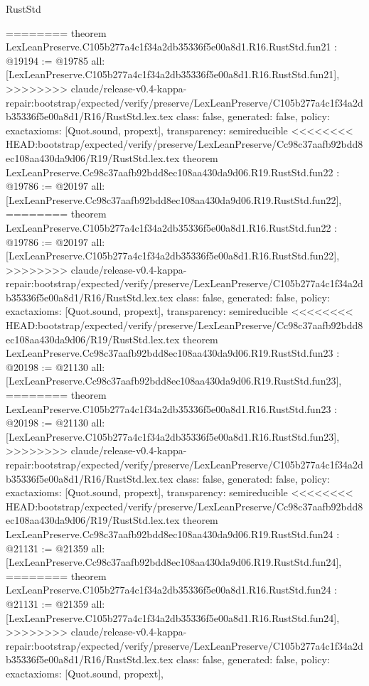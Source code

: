 \begin{lexlean}{RustStd}
\begin{coremodule}
{\begin{coremodule}
{{{{{{{{{{{{{{{{{{{{{{{{========
theorem LexLeanPreserve.C105b277a4c1f34a2db35336f5e00a8d1.R16.RustStd.fun21 : @19194 := @19785 {
  all: [LexLeanPreserve.C105b277a4c1f34a2db35336f5e00a8d1.R16.RustStd.fun21],
>>>>>>>> claude/release-v0.4-kappa-repair:bootstrap/expected/verify/preserve/LexLeanPreserve/C105b277a4c1f34a2db35336f5e00a8d1/R16/RustStd.lex.tex
  class: false,
  generated: false,
  policy: exact{axioms: [Quot.sound, propext]},
  transparency: semireducible
}
<<<<<<<< HEAD:bootstrap/expected/verify/preserve/LexLeanPreserve/Cc98c37aafb92bdd8ec108aa430da9d06/R19/RustStd.lex.tex
theorem LexLeanPreserve.Cc98c37aafb92bdd8ec108aa430da9d06.R19.RustStd.fun22 : @19786 := @20197 {
  all: [LexLeanPreserve.Cc98c37aafb92bdd8ec108aa430da9d06.R19.RustStd.fun22],
========
theorem LexLeanPreserve.C105b277a4c1f34a2db35336f5e00a8d1.R16.RustStd.fun22 : @19786 := @20197 {
  all: [LexLeanPreserve.C105b277a4c1f34a2db35336f5e00a8d1.R16.RustStd.fun22],
>>>>>>>> claude/release-v0.4-kappa-repair:bootstrap/expected/verify/preserve/LexLeanPreserve/C105b277a4c1f34a2db35336f5e00a8d1/R16/RustStd.lex.tex
  class: false,
  generated: false,
  policy: exact{axioms: [Quot.sound, propext]},
  transparency: semireducible
}
<<<<<<<< HEAD:bootstrap/expected/verify/preserve/LexLeanPreserve/Cc98c37aafb92bdd8ec108aa430da9d06/R19/RustStd.lex.tex
theorem LexLeanPreserve.Cc98c37aafb92bdd8ec108aa430da9d06.R19.RustStd.fun23 : @20198 := @21130 {
  all: [LexLeanPreserve.Cc98c37aafb92bdd8ec108aa430da9d06.R19.RustStd.fun23],
========
theorem LexLeanPreserve.C105b277a4c1f34a2db35336f5e00a8d1.R16.RustStd.fun23 : @20198 := @21130 {
  all: [LexLeanPreserve.C105b277a4c1f34a2db35336f5e00a8d1.R16.RustStd.fun23],
>>>>>>>> claude/release-v0.4-kappa-repair:bootstrap/expected/verify/preserve/LexLeanPreserve/C105b277a4c1f34a2db35336f5e00a8d1/R16/RustStd.lex.tex
  class: false,
  generated: false,
  policy: exact{axioms: [Quot.sound, propext]},
  transparency: semireducible
}
<<<<<<<< HEAD:bootstrap/expected/verify/preserve/LexLeanPreserve/Cc98c37aafb92bdd8ec108aa430da9d06/R19/RustStd.lex.tex
theorem LexLeanPreserve.Cc98c37aafb92bdd8ec108aa430da9d06.R19.RustStd.fun24 : @21131 := @21359 {
  all: [LexLeanPreserve.Cc98c37aafb92bdd8ec108aa430da9d06.R19.RustStd.fun24],
========
theorem LexLeanPreserve.C105b277a4c1f34a2db35336f5e00a8d1.R16.RustStd.fun24 : @21131 := @21359 {
  all: [LexLeanPreserve.C105b277a4c1f34a2db35336f5e00a8d1.R16.RustStd.fun24],
>>>>>>>> claude/release-v0.4-kappa-repair:bootstrap/expected/verify/preserve/LexLeanPreserve/C105b277a4c1f34a2db35336f5e00a8d1/R16/RustStd.lex.tex
  class: false,
  generated: false,
  policy: exact{axioms: [Quot.sound, propext]},
}}}}}}}}}}}}}}}}}}}}}}}}}}}}
\end{coremodule}}
\end{coremodule}
\end{lexlean}
